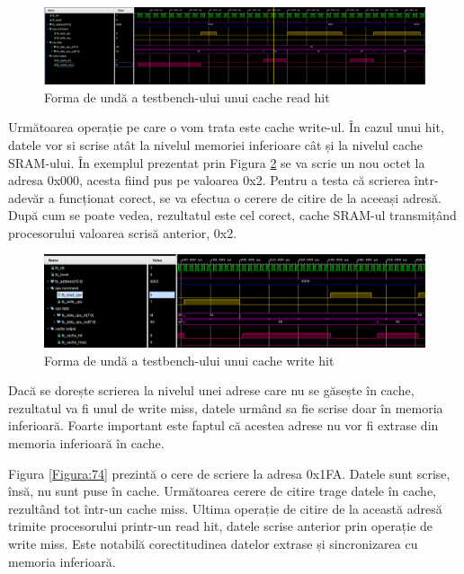 \documentclass[12pt]{article}
\begin{document}
 \newpage 
 \begin{figure}[h!]
 \hspace*{-0.5cm}\includegraphics[width=1.05\textwidth]{cachehit1.png}
 \centering
 \caption{Forma de undă a testbench-ului unui cache read hit}
 \label{Figura:72}
 \end{figure}
 
Următoarea operație pe care o vom trata este cache write-ul. În cazul unui hit, datele vor si scrise atât la nivelul memoriei inferioare cât și la nivelul cache SRAM-ului. În exemplul prezentat prin Figura \ref{Figura:73} se va scrie un nou octet la adresa 0x000, acesta fiind pus pe valoarea 0x2. Pentru a testa că scrierea într-adevăr a funcționat corect, se va efectua o cerere de citire de la aceeași adresă. După cum se poate vedea, rezultatul este cel corect, cache SRAM-ul transmițând procesorului valoarea scrisă anterior, 0x2.
 
 \begin{figure}[h!]
 \hspace*{-0.5cm}\includegraphics[width=1.06\textwidth]{cachewrite1.png}
 \centering
 \caption{Forma de undă a testbench-ului unui cache write hit}
 \label{Figura:73}
 \end{figure}

Dacă se dorește scrierea la nivelul unei adrese care nu se găsește în cache, rezultatul va fi unul de write miss, datele urmând sa fie scrise doar în memoria inferioară. Foarte important este faptul că acestea adrese nu vor fi extrase din memoria inferioară în cache.

  Figura \ref{Figura:74} prezintă o cere de scriere la adresa 0x1FA. Datele sunt scrise, însă, nu sunt puse în cache. Următoarea cerere de citire trage datele în cache, rezultând tot într-un cache miss. Ultima operație de citire de la această adresă trimite procesorului printr-un read hit, datele scrise anterior prin operație de write miss. Este notabilă corectitudinea datelor extrase și sincronizarea cu memoria inferioară.
 
\end{document}
